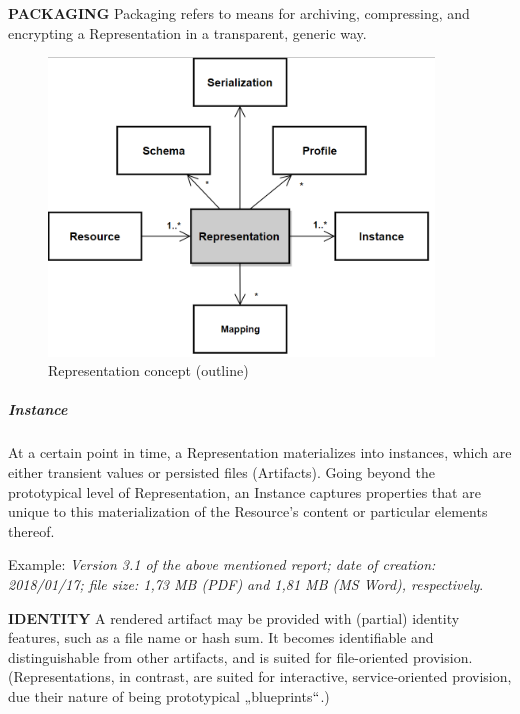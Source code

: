 \textbf{PACKAGING} Packaging refers to means for archiving, compressing, and encrypting a Representation in a transparent, generic way.




\begin{figure}[H]
	\begin{Center}
		\includegraphics[width=4.03in,height=3.12in]{./media/image36.png}
		\caption{Representation concept (outline)}
		\label{fig:Representation_concept_outline}
	\end{Center}
\end{figure}




\subparagraph*{Instance}
At a certain point in time, a Representation materializes into instances, which are either transient values or persisted files (Artifacts). Going beyond the prototypical level of Representation, an Instance captures properties that are unique to this materialization of the Resource’s content or particular elements thereof. 



Example: \textit{Version 3.1 of the above mentioned report; date of creation: 2018/01/17; file size: 1,73 MB (PDF) and 1,81 MB (MS Word), respectively}.



\textbf{IDENTITY} A rendered artifact may be provided with (partial) identity features, such as a file name or hash sum. It becomes identifiable and distinguishable from other artifacts, and is suited for file-oriented provision. (Representations, in contrast, are suited for interactive, service-oriented provision, due their nature of being prototypical „blueprints$``$.) 

